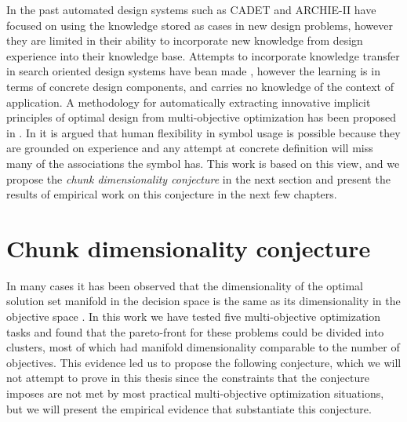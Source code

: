 In the past automated design systems such as CADET \citep{sycara91} and
ARCHIE-II \citep{domeshek91} have focused on using the knowledge stored as
cases in new design problems, however they are limited in their ability to
incorporate new knowledge from design experience into their knowledge
base. Attempts to incorporate knowledge transfer in search oriented design
systems have bean made \citep{moss04}, however the learning is in terms of
concrete design components, and carries no knowledge of the context of
application. A methodology for automatically extracting innovative implicit
principles of optimal design from multi-objective optimization has been
proposed in \citep{deb10}. In \citep{mukerjee09} it is argued that human
flexibility in symbol usage is possible because they are grounded on
experience and any attempt at concrete definition will miss many of the
associations the symbol has. This work is based on this view, and we
propose the {\em chunk dimensionality conjecture} in the next section and
present the results of empirical work on this conjecture in the next few
chapters.

\section{Chunk dimensionality conjecture}
\label{cdc}

In many cases it has been observed that the dimensionality of the optimal
solution set manifold in the decision space is the same as its
dimensionality in the objective space \citep{mukerjee09}. In this work we
have tested five multi-objective optimization tasks and found that the
pareto-front for these problems could be divided into clusters, most of
which had manifold dimensionality comparable to the number of
objectives. This evidence led us to propose the following conjecture, which
we will not attempt to prove in this thesis since the constraints that the
conjecture imposes are not met by most practical multi-objective
optimization situations, but we will present the empirical evidence that
substantiate this conjecture.


